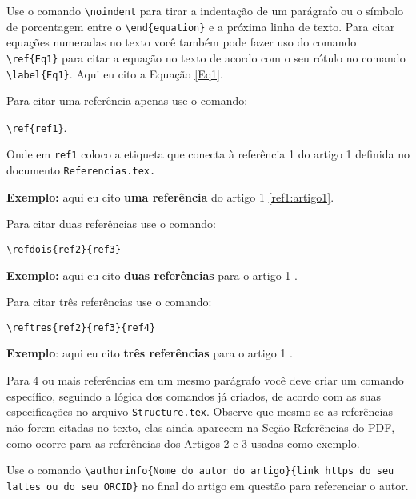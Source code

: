 \begin{multicols}{2}
Use o comando \texttt{\textbackslash noindent} para tirar a indentação de um parágrafo ou o símbolo de porcentagem entre o \texttt{\textbackslash end\{equation\}} e a próxima linha de texto. Para citar equações numeradas no texto você também pode fazer uso do comando \texttt{\textbackslash ref\{Eq1\}} para citar a equação no texto de acordo com o seu rótulo no comando \texttt{\textbackslash label\{Eq1\}}. Aqui eu cito a Equação \ref{Eq1}.





\lipsum[1]

Para citar uma referência apenas use o comando:

\texttt{\textbackslash ref\{ref1\}}. 

\noindent Onde em \texttt{ref1} coloco a etiqueta que conecta à referência 1 do artigo 1 definida no documento \texttt{Referencias.tex.}

\noindent\textbf{Exemplo:} aqui eu cito \textbf{uma referência} do artigo 1 \ref{ref1:artigo1}.

Para citar duas referências use o comando:

\noindent\texttt{\textbackslash refdois\{ref2\}\{ref3\}}

\noindent \textbf{Exemplo:} aqui eu cito \textbf{duas referências} para o artigo 1 .

Para citar três referências use o comando:

\noindent\texttt{\textbackslash reftres\{ref2\}\{ref3\}\{ref4\}}

\noindent \textbf{Exemplo}: aqui eu cito \textbf{três referências} para o artigo 1 .

Para 4 ou mais referências em um mesmo parágrafo você deve criar um comando específico, seguindo a lógica dos comandos já criados, de acordo com as suas especificações no arquivo \texttt{Structure.tex}. Observe que mesmo se as referências não forem citadas no texto, elas ainda aparecem na Seção Referências do PDF, como ocorre para as referências dos Artigos 2 e 3 usadas como exemplo.








Use o comando \texttt{\textbackslash authorinfo\{Nome do autor do artigo\}\{link https do seu lattes ou do seu ORCID\}} no final do artigo em questão para referenciar o autor.





\end{multicols}

